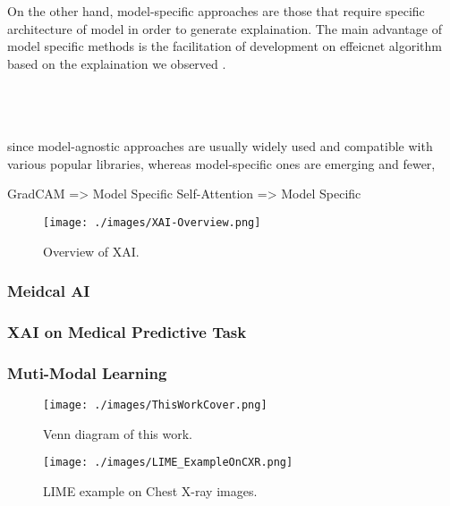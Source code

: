 On the other hand, model-specific approaches are those that require specific architecture of model in order to generate explaination. The main advantage of model specific methods is the facilitation of development on effeicnet algorithm based on the explaination we observed \citep{Belle2020XAIPriciples}.





% 

\\
\\
\\
since model-agnostic approaches are usually widely
used and compatible with various popular libraries, whereas
model-specific ones are emerging and fewer, \citep{Belle2020XAIPriciples}

GradCAM => Model Specific
Self-Attention => Model Specific

\begin{figure}[!h]
    \centering
    \texttt{[image: ./images/XAI-Overview.png]}
    \caption{Overview of XAI. \citet{Belle2020XAIPriciples}}
    \label{fig: XAI_Overview}
\end{figure}

\subsubsection{Meidcal AI}

\subsubsection{XAI on Medical Predictive Task}

\subsubsection{Muti-Modal Learning}


\begin{figure}[!h]
    \centering
    \texttt{[image: ./images/ThisWorkCover.png]}
    \caption{Venn diagram of this work.}
    \label{fig: this_work_cover}
\end{figure}

\begin{figure}[!h]
    \centering
    \texttt{[image: ./images/LIME\_ExampleOnCXR.png]}
    \caption{LIME example on Chest X-ray images. \citep{Teixeira2021LIMEAndGradCAMOnCXR}}
    \label{fig: LIME_ExampleOnCXR}
\end{figure}

